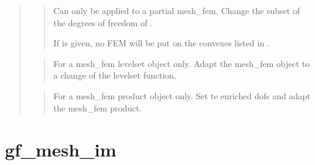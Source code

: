 \documentclass[a4paper,11pt,english]{sphinxmanual}
\begin{document}
\begin{quote}
\sphinxAtStartPar
{}
\begin{quote}

\sphinxAtStartPar
Can only be applied to a partial mesh\_fem. Change the subset of the
degrees of freedom of .

\sphinxAtStartPar
If  is given, no FEM will be put on the convexes listed
in .
\end{quote}

\sphinxAtStartPar
{}
\begin{quote}

\sphinxAtStartPar
For a mesh\_fem levelset object only. Adapt the mesh\_fem object to a
change of the levelset function.
\end{quote}

\sphinxAtStartPar
{}
\begin{quote}

\sphinxAtStartPar
For a mesh\_fem product object only. Set te enriched dofs and adapt the mesh\_fem product.
\end{quote}
\end{quote}


\section{gf\_mesh\_im}
\label{\detokenize{matlab_octave/cmdref_gf_mesh_im:gf-mesh-im}}\label{\detokenize{matlab_octave/cmdref_gf_mesh_im::doc}}
\sphinxAtStartPar
{}
\end{document}
